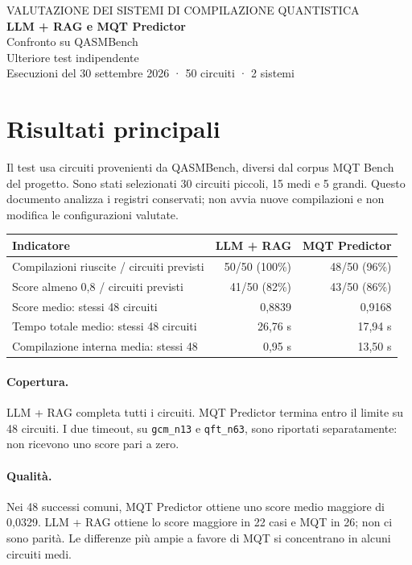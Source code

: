 \documentclass[11pt,a4paper]{article}
\begin{document}
\begin{center}
{\small\color{muted} VALUTAZIONE DEI SISTEMI DI COMPILAZIONE QUANTISTICA}\\[8pt]
{\LARGE\bfseries\color{navy} LLM + RAG e MQT Predictor}\\[5pt]
{\Large Confronto su QASMBench}\\[9pt]
{\large Ulteriore test indipendente}\\[7pt]
{\small Esecuzioni del 30 settembre 2026 · 50 circuiti · 2 sistemi}
\end{center}
\vspace{8pt}
\section{Risultati principali}
Il test usa circuiti provenienti da QASMBench, diversi dal corpus MQT Bench del progetto.
Sono stati selezionati 30 circuiti piccoli, 15 medi e 5 grandi. Questo documento analizza
i registri conservati; non avvia nuove compilazioni e non modifica le configurazioni valutate.

\begin{center}
\small
\setlength{\tabcolsep}{5pt}
\begin{tabular}{lrr}
\toprule
Indicatore & LLM + RAG & MQT Predictor\\
\midrule
Compilazioni riuscite / circuiti previsti & 50/50 (100\%) & 48/50 (96\%)\\
Score almeno 0,8 / circuiti previsti & 41/50 (82\%) & 43/50 (86\%)\\
Score medio: stessi 48 circuiti & 0,8839 & 0,9168\\
Tempo totale medio: stessi 48 circuiti & 26,76 s & 17,94 s\\
Compilazione interna media: stessi 48 & 0,95 s & 13,50 s\\
\bottomrule
\end{tabular}\end{center}

\paragraph{Copertura.}
LLM + RAG completa tutti i circuiti. MQT Predictor termina entro il limite su 48 circuiti.
I due timeout, su \texttt{gcm\_n13} e \texttt{qft\_n63}, sono riportati separatamente:
non ricevono uno score pari a zero.
\paragraph{Qualità.}
Nei 48 successi comuni, MQT Predictor ottiene uno score medio maggiore di 0,0329. LLM + RAG ottiene lo score maggiore in 22 casi e MQT in 26; non ci sono parità. Le differenze più ampie a favore di MQT si concentrano in alcuni circuiti medi.
\end{document}
